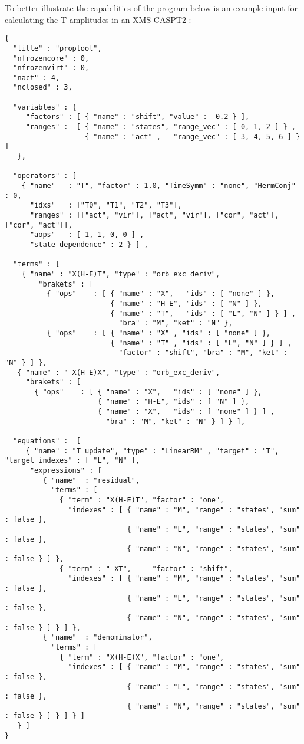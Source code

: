 To better illustrate the capabilities of the program below is an example input
for calculating the T-amplitudes in an XMS-CASPT2 :
\begin{lstlisting}[label={lst:input}]
{
  "title" : "proptool",
  "nfrozencore" : 0,
  "nfrozenvirt" : 0,
  "nact" : 4,
  "nclosed" : 3,

  "variables" : {
     "factors" : [ { "name" : "shift", "value" :  0.2 } ],
     "ranges" :  [ { "name" : "states", "range_vec" : [ 0, 1, 2 ] } ,
                   { "name" : "act" ,   "range_vec" : [ 3, 4, 5, 6 ] } ]
   },

  "operators" : [
    { "name"   : "T", "factor" : 1.0, "TimeSymm" : "none", "HermConj" : 0,
      "idxs"   : ["T0", "T1", "T2", "T3"],
      "ranges" : [["act", "vir"], ["act", "vir"], ["cor", "act"], ["cor", "act"]],
      "aops"   : [ 1, 1, 0, 0 ] ,
      "state dependence" : 2 } ] ,

  "terms" : [
    { "name" : "X(H-E)T", "type" : "orb_exc_deriv",
        "brakets" : [
          { "ops"    : [ { "name" : "X",   "ids" : [ "none" ] },
                         { "name" : "H-E", "ids" : [ "N" ] },
                         { "name" : "T",   "ids" : [ "L", "N" ] } ] ,
                           "bra" : "M", "ket" : "N" }, 
          { "ops"    : [ { "name" : "X" , "ids" : [ "none" ] },
                         { "name" : "T" , "ids" : [ "L", "N" ] } ] ,
                           "factor" : "shift", "bra" : "M", "ket" : "N" } ] },
   { "name" : "-X(H-E)X", "type" : "orb_exc_deriv",
     "brakets" : [
       { "ops"    : [ { "name" : "X",   "ids" : [ "none" ] },
                      { "name" : "H-E", "ids" : [ "N" ] },
                      { "name" : "X",   "ids" : [ "none" ] } ] ,
                        "bra" : "M", "ket" : "N" } ] } ],

  "equations" :  [
     { "name" : "T_update", "type" : "LinearRM" , "target" : "T", "target indexes" : [ "L", "N" ],
      "expressions" : [
         { "name"  : "residual",
           "terms" : [
             { "term" : "X(H-E)T", "factor" : "one",
               "indexes" : [ { "name" : "M", "range" : "states", "sum" : false },
                             { "name" : "L", "range" : "states", "sum" : false },
                             { "name" : "N", "range" : "states", "sum" : false } ] },
             { "term" : "-XT",     "factor" : "shift",
               "indexes" : [ { "name" : "M", "range" : "states", "sum" : false },
                             { "name" : "L", "range" : "states", "sum" : false },
                             { "name" : "N", "range" : "states", "sum" : false } ] } ] },
         { "name"  : "denominator",
           "terms" : [
             { "term" : "X(H-E)X", "factor" : "one",                                                 
               "indexes" : [ { "name" : "M", "range" : "states", "sum" : false },
                             { "name" : "L", "range" : "states", "sum" : false },
                             { "name" : "N", "range" : "states", "sum" : false } ] } ] } ]
   } ]
}                                                 
\end{lstlisting}         

